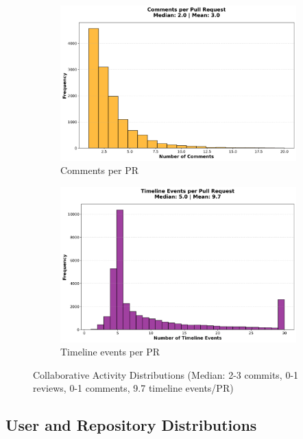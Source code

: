 \documentclass[11pt]{article}
\begin{document}
\begin{figure}[H]
\begin{subfigure}[b]{0.48\textwidth}
\centering
\includegraphics[width=\textwidth]{figures_individual/16_comments_per_pr_histogram.png}
\caption{Comments per PR}
\label{fig:comments}
\end{subfigure}
\hfill
\begin{subfigure}[b]{0.48\textwidth}
\centering
\includegraphics[width=\textwidth]{figures_individual/18_timeline_events_per_pr_histogram.png}
\caption{Timeline events per PR}
\label{fig:timeline}
\end{subfigure}

\caption{Collaborative Activity Distributions (Median: 2-3 commits, 0-1 reviews, 0-1 comments, 9.7 timeline events/PR)}
\label{fig:commit_review_all}
\end{figure}

\subsection{User and Repository Distributions}
\end{document}
